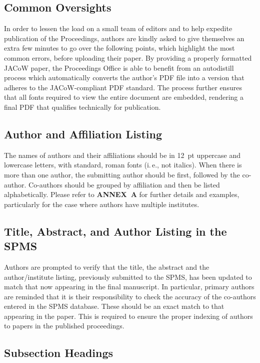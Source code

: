 \documentclass[a4paper,
              ]{jacow}
\newcommand\SEC[1]{\textbf{\uppercase{#1}}}
\begin{document}
\subsection{Common Oversights}

In order to lessen the load on a small team of editors
and to help expedite publication of the Proceedings, authors
are kindly asked to give themselves an extra few
minutes to go over the following points, which highlight
the most common errors, before uploading their paper. By
providing a properly formatted JACoW paper, the Proceedings
Office is able to benefit from an autodistill process
which automatically converts the author's PDF file
into a version that adheres to the JACoW-compliant PDF
standard. The process further ensures that all fonts required
to view the entire document are embedded, rendering
a final PDF that qualifies technically for publication.


\subsection{Author and Affiliation Listing}

The names of authors and their affiliations should be in
\SI{12}{pt} uppercase and lowercase letters, with standard,
roman fonts (i.\,e., not italics). When there is more than
one author, the submitting author should be first, followed
by the co-author. Co-authors should be grouped by affiliation
and then be listed alphabetically. Please refer to \SEC{Annex~A}
for further details and examples, particularly for
the case where authors have multiple institutes.

\subsection{Title, Abstract, and Author Listing in the SPMS}

Authors are prompted to verify that the title, the abstract
and the author/institute listing, previously submitted
to the SPMS, has been updated to match that now appearing
in the final manuscript. In particular, primary authors
are reminded that it is their responsibility to check the
accuracy of the co-authors entered in the SPMS database.
These should be an exact match to that appearing in the
paper. This is required to ensure the proper indexing of
authors to papers in the published proceedings.

\subsection{Subsection Headings}
\end{document}

